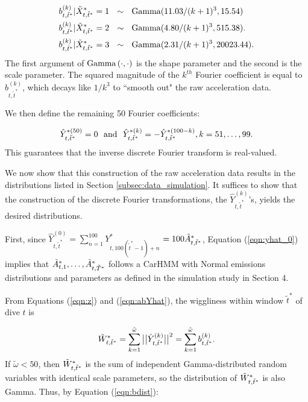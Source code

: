     \begin{align}
    \begin{split}
    	b^{(k)}_{t,\tilde t^*}|\tilde X^*_{t,\tilde t^*} = 1 &~~\sim~~ {\rm{Gamma}}(11.03/(k+1)^3, 15.54) \\
    	b^{(k)}_{t,\tilde t^*}|\tilde X^*_{t,\tilde t^*} = 2  &~~\sim ~~{\rm{Gamma}}(4.80/(k+1)^3, 515.38). \\ 
    	b^{(k)}_{t,\tilde t^*}|\tilde X^*_{t,\tilde t^*} = 3  &~~\sim ~~{\rm{Gamma}}(2.31/(k+1)^3, 20023.44). 
    \end{split}
    \label{eqn:bdist}
    \end{align}
    The first argument of ${\rm{Gamma}}\left(\cdot,\cdot\right)$ is the shape parameter and the second is the scale parameter. The squared magnitude of the $k^{th}$ Fourier coefficient is equal to $b^{(k)}_{t,\tilde t^*}$, which decays like $1/k^3$ to ``smooth out" the raw acceleration data.
    
   We then define the remaining 50 Fourier coefficients:
   
    \[
        \hat{Y}^{*(50)}_{t,\tilde t^*} = 0 {\rm{~~and ~~}}
	    \hat{Y}^{*(k)}_{t,\tilde t^*} = -\hat{Y}^{*(100-k)}_{t,\tilde t^*} , k = 51,\ldots,99.
    \]
   This guarantees that the inverse discrete Fourier transform is real-valued. 
  

We now show that this construction of the raw acceleration data results in the distributions listed in Section \ref{subsec:data_simulation}. It suffices to show that the construction of the discrete Fourier transformations, the $\hat{Y}^{(k)}_{t,\tilde t^*}$'s, yields the desired distributions.

First, since $\hat{Y}^{(0)}_{t,\tilde t^*} = \sum_{n=1}^{100} Y^*_{t,100(\tilde t^* - 1) + n} $ $=100\tilde{A}^*_{t,\tilde{t}^*}$, Equation (\ref{eqn:yhat_0}) implies that 
$\tilde{A}^*_{t,1}, \ldots, \tilde{A}^*_{t,\tilde{T}^*}$ 
follows a CarHMM with Normal emissions distributions and parameters as defined in the simulation study in Section 4.

From Equations (\ref{eqn:z}) and (\ref{eqn:abYhat}), 
the wiggliness within window $\tilde t^*$ of dive $t$ is 

\[
    \tilde{W}^*_{t,\tilde t^*} = \sum_{k=1}^{\tilde \omega} \big|\big|\hat{Y}^{(k)}_{t,\tilde t^*}\big|\big|^2 =  \sum_{k=1}^{\tilde \omega} b^{(k)}_{t,\tilde t^*}.
\]
%
If $\tilde \omega < 50$, then $\tilde{W}^*_{t,\tilde t^*}$ is the sum of independent Gamma-distributed random variables with identical scale parameters, so the distribution of $\tilde{W}^*_{t,\tilde t^*}$ is also Gamma. Thus, by Equation (\ref{eqn:bdist}):

